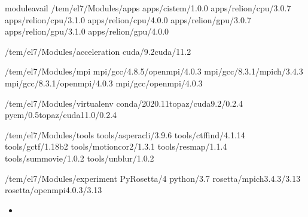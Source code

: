 \documentclass[a4paper,11pt,english]{sphinxmanual}
\begin{document}
\begin{sphinxVerbatim}[commandchars=\\\{\}]
\PYGZdl{}\PYGZgt{}moduleavail
\PYGZhy{}\PYGZhy{}\PYGZhy{}\PYGZhy{}\PYGZhy{}\PYGZhy{}\PYGZhy{}\PYGZhy{}/tem/el7/Modules/apps\PYGZhy{}\PYGZhy{}\PYGZhy{}\PYGZhy{}\PYGZhy{}\PYGZhy{}\PYGZhy{}\PYGZhy{}
apps/cistem/1.0.0
apps/relion/cpu/3.0.7
apps/relion/cpu/3.1.0
apps/relion/cpu/4.0.0
apps/relion/gpu/3.0.7
apps/relion/gpu/3.1.0
apps/relion/gpu/4.0.0

\PYGZhy{}\PYGZhy{}\PYGZhy{}\PYGZhy{}/tem/el7/Modules/acceleration\PYGZhy{}\PYGZhy{}\PYGZhy{}\PYGZhy{}
cuda/9.2cuda/11.2

\PYGZhy{}\PYGZhy{}\PYGZhy{}\PYGZhy{}\PYGZhy{}\PYGZhy{}\PYGZhy{}\PYGZhy{}/tem/el7/Modules/mpi\PYGZhy{}\PYGZhy{}\PYGZhy{}\PYGZhy{}\PYGZhy{}\PYGZhy{}\PYGZhy{}\PYGZhy{}\PYGZhy{}
mpi/gcc/4.8.5/openmpi/4.0.3
mpi/gcc/8.3.1/mpich/3.4.3
mpi/gcc/8.3.1/openmpi/4.0.3
mpi/gcc/openmpi/4.0.3

\PYGZhy{}\PYGZhy{}\PYGZhy{}\PYGZhy{}\PYGZhy{}/tem/el7/Modules/virtualenv\PYGZhy{}\PYGZhy{}\PYGZhy{}\PYGZhy{}\PYGZhy{}
conda/2020.11topaz/cuda\PYGZhy{}9.2/0.2.4
pyem/0.5topaz/cuda\PYGZhy{}11.0/0.2.4

\PYGZhy{}\PYGZhy{}\PYGZhy{}\PYGZhy{}\PYGZhy{}\PYGZhy{}\PYGZhy{}/tem/el7/Modules/tools\PYGZhy{}\PYGZhy{}\PYGZhy{}\PYGZhy{}\PYGZhy{}\PYGZhy{}\PYGZhy{}\PYGZhy{}
tools/aspera\PYGZhy{}cli/3.9.6
tools/ctffind/4.1.14
tools/gctf/1.18\PYGZus{}b2
tools/motioncor2/1.3.1
tools/resmap/1.1.4
tools/summovie/1.0.2
tools/unblur/1.0.2

\PYGZhy{}\PYGZhy{}\PYGZhy{}\PYGZhy{}\PYGZhy{}/tem/el7/Modules/experiment\PYGZhy{}\PYGZhy{}\PYGZhy{}\PYGZhy{}\PYGZhy{}
PyRosetta/4
python/3.7
rosetta/mpich\PYGZhy{}3.4.3/3.13
rosetta/openmpi\PYGZhy{}4.0.3/3.13
\end{sphinxVerbatim}
\begin{itemize}
\item {} 
\sphinxAtStartPar
{}

\end{itemize}
\end{document}
